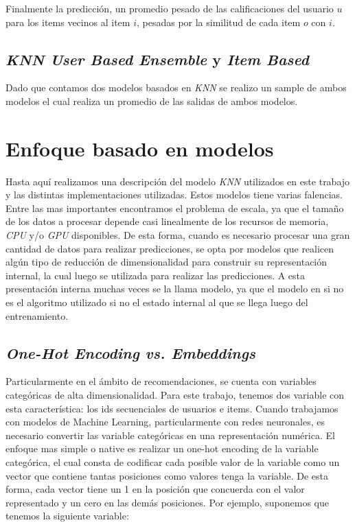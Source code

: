 \documentclass[11pt,a4paper,twoside]{thesis}
\begin{document}
Finalmente la predicción, un promedio pesado de las calificaciones del usuario $u$ para los items vecinos al item $i$, pesadas por la similitud de cada item $o$ con $i$.

\subsection{\textit{KNN User Based Ensemble} y \textit{Item Based}}

Dado que contamos dos modelos basados en \textit{KNN} se realizo un sample de ambos modelos el cual realiza un promedio de las salidas de ambos modelos.

\section{Enfoque basado en modelos}

Hasta aquí realizamos una descripción del modelo \textit{KNN} utilizados en este trabajo y las distintas implementaciones utilizadas. Estos modelos tiene varias falencias. Entre las mas importantes encontramos el problema de escala, ya que el tamaño de los datos a procesar depende casi linealmente de los recursos de memoria, \textit{CPU} y/o \textit{GPU} disponibles. De esta forma, cuando es necesario procesar una gran cantidad de datos para realizar predicciones, se opta por modelos que realicen algún tipo de reducción de dimensionalidad para construir su representación internal, la cual luego se utilizada para realizar las predicciones. A esta presentación interna muchas veces se la llama modelo, ya que el modelo en si no es el algoritmo utilizado si no el estado internal al que se llega luego del entrenamiento. 

\subsection{\textit{One-Hot Encoding vs. Embeddings}}

Particularmente en el ámbito de recomendaciones, se cuenta con variables categóricas de alta dimensionalidad. Para este trabajo, tenemos dos variable con esta característica: los ids secuenciales de usuarios e items. Cuando trabajamos con modelos de Machine Learning, particularmente con redes neuronales, es necesario convertir las variable categóricas en una representación numérica. El enfoque mas simple o native es realizar un one-hot encoding de la variable categórica, el cual consta de codificar cada posible valor de la variable como un vector que contiene tantas posiciones como valores tenga la variable. De esta forma, cada vector tiene un 1 en la posición que concuerda con el valor representado y un cero en las demás posiciones. Por ejemplo, suponemos que tenemos la siguiente variable:
\end{document}
